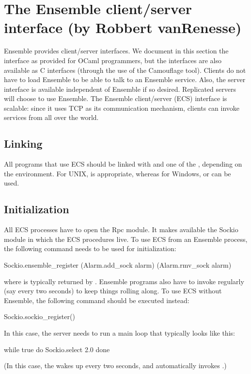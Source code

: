 \section{The Ensemble client/server interface (by Robbert vanRenesse)}

Ensemble provides client/server interfaces.  We document in this section the
interface as provided for OCaml programmers, but the interfaces are also available as
C interfaces (through the use of the Camouflage tool).  Clients do not have to load
Ensemble to be able to talk to an Ensemble service.  Also, the server interface is
available independent of Ensemble if so desired.  Replicated servers will choose to
use Ensemble.  The Ensemble client/server (ECS) interface is scalable: since it uses
TCP as its communication mechanism, clients can invoke services from all over the
world.

\subsection{Linking}

All programs that use ECS should be linked with  and one
of the , depending on the environment.  For UNIX,
 is appropriate, whereas for Windows,
 or  can be used.

\subsection{Initialization}

All ECS processes have to open the Rpc module.  It makes available the Sockio module
in which the ECS procedures live.  To use ECS from an Ensemble process, the following
command needs to be used for initialization:

\begin{codebox}
  Sockio.ensemble_register (Alarm.add_sock alarm) (Alarm.rmv_sock alarm)
\end{codebox}
where  is typically returned by .  Ensemble
programs also have to invoke  regularly (say every two seconds)
to keep things rolling along.  To use ECS without Ensemble, the following command
should be executed instead:
\begin{codebox}
  Sockio.sockio_register()
\end{codebox}

In this case, the server needs to run a main loop that typically looks like this:
\begin{codebox}
  while true do
    Sockio.select 2.0
  done
\end{codebox}
(In this case, the  wakes up every two seconds, and
automatically invokes .)

